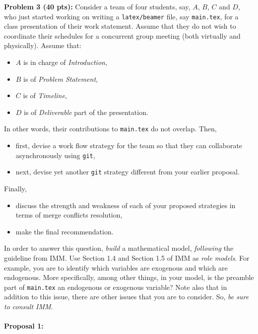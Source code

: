 \documentclass[12pt]{article}
\begin{document}
\newpage
\noindent\textbf{Problem 3 (40 pts):}
Consider a team of four students, say, $A$, $B$, $C$ and $D$, 
who just started working 
on writing a \texttt{latex/beamer} file, say \texttt{main.tex}, 
for a class presentation of their work statement.  
Assume that they do not wish to coordinate their schedules for a
concurrent group meeting (both virtually and physically).  
Assume that:
\begin{itemize}
\item $A$ is in charge of \emph{Introduction},
\item $B$ is of \emph{Problem Statement}, 
\item $C$ is of  \emph{Timeline},
\item $D$ is of \emph{Deliverable} part of the presentation.  
\end{itemize}
In other words, their contributions to \texttt{main.tex} do not overlap.
Then, 
\begin{itemize}
\item first, devise a work flow strategy for the team so that they can
  collaborate asynchronously using \texttt{git},
\item next, devise yet another \texttt{git} strategy different from your earlier
  proposal.  
\end{itemize}
Finally,
\begin{itemize}
\item discuss the strength and weakness of each of your proposed strategies in terms of merge
conflicts resolution,
\item make the final recommendation.  
\end{itemize}
In order to answer this question, \emph{build}
a mathematical model, \emph{following} the guideline from IMM. 
Use Section 1.4 and Section 1.5 of IMM as \emph{role models}.    
For example, you are to identify which variables  are exogenous 
and which are endogenous.  More specifically, among other things, 
in your model, is the preamble part of \texttt{main.tex} an endogenous 
or exogenous variable?  
Note also that in addition to this issue, there are other issues that
you are to consider.  So, \emph{be sure to consult IMM}. 
\paragraph {Proposal 1:}
\end{document}
